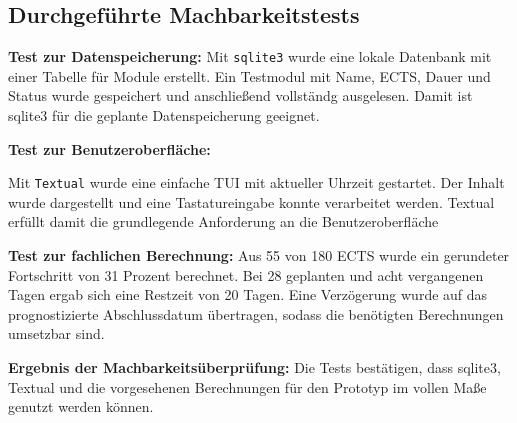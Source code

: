 \documentclass[11pt,a4paper]{article}
\begin{document}
\subsection{Durchgeführte Machbarkeitstests}

\textbf{Test zur Datenspeicherung:}
Mit \texttt{sqlite3} wurde eine lokale Datenbank mit einer Tabelle für Module erstellt. Ein Testmodul mit Name, ECTS, Dauer und Status wurde gespeichert und anschließend vollständg ausgelesen. Damit ist sqlite3 für die geplante Datenspeicherung geeignet.


\textbf{Test zur Benutzeroberfläche:}


Mit \texttt{Textual} wurde eine einfache TUI mit aktueller Uhrzeit gestartet. Der Inhalt wurde dargestellt und eine Tastatureingabe konnte verarbeitet werden. Textual erfüllt damit die grundlegende Anforderung an die Benutzeroberfläche


\textbf{Test zur fachlichen Berechnung:}
Aus 55 von 180 ECTS wurde ein gerundeter Fortschritt von 31 Prozent berechnet. Bei 28 geplanten und acht vergangenen Tagen ergab sich eine Restzeit von 20 Tagen. Eine Verzögerung wurde auf das prognostizierte Abschlussdatum übertragen, sodass die benötigten Berechnungen umsetzbar sind.

\textbf{Ergebnis der Machbarkeitsüberprüfung:}
Die Tests bestätigen, dass sqlite3, Textual und die vorgesehenen Berechnungen für den Prototyp im vollen Maße genutzt werden können.


\end{document}
